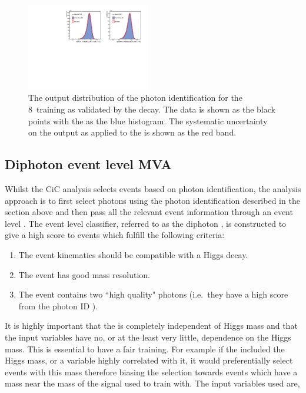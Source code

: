 \begin{figure}
  \includegraphics[width=0.48\textwidth]{ch4_selec_and_cats/plots/photonID_zee_8TeV.pdf}
  \caption{The output distribution of the photon identification \BDT for the 8~\TeV training as validated by the \Zee decay. The data is shown as the black points with the \MC as the blue histogram. The systematic uncertainty on the output as applied to the \MC is shown as the red band. }
  \label{fig:photon_id_zee}
\end{figure}

\subsection{Diphoton event level MVA}
\label{sec:diphoton_bdt}

Whilst the CiC analysis selects events based on photon identification, the \MVA analysis approach is to first select photons using the photon identification \BDT described in the section above and then pass all the relevant event information through an event level \BDT. The event level classifier, referred to as the diphoton \BDT, is constructed to give a high score to events which fulfill the following criteria:

\begin{enumerate}
  \item The event kinematics should be compatible with a Higgs decay.
  \item The event has good mass resolution.
  \item The event contains two ``high quality" photons (i.e.~they have a high score from the photon ID \BDT).
\end{enumerate}

It is highly important that the \BDT is completely independent of Higgs mass and that the input variables have no, or at the least very little, dependence on the Higgs mass. This is essential to have a fair training. For example if the \BDT included the Higgs mass, or a variable highly correlated with it, it would preferentially select events with this mass therefore biasing the selection towards events which have a mass near the mass of the signal used to train with. The input variables used are,

